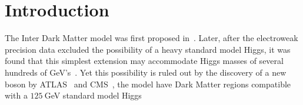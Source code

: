 \documentclass{article}
\begin{document}
\section{Introduction}
The Inter Dark Matter model was first proposed
in~\cite{Deshpande:1977rw}. Later, after the electroweak precision
data excluded the possibility of a heavy standard model Higgs, it was
found that this simplest extension may accommodate Higgs masses of
several hundreds of GeV's~\cite{hep-ph/0603188}. Yet this possibility
is ruled out by the discovery of a new boson by ATLAS~\cite{1207.7214}
and CMS~\cite{1207.7235}, the model have Dark Matter regions compatible
with a $125\ $GeV standard model
Higgs~\cite{hep-ph/0612275,0903.4010,0911.0540}


\end{document}

